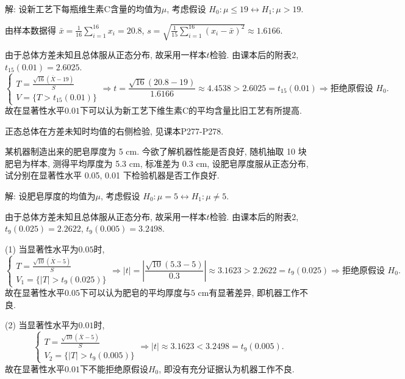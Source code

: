 \documentclass[standard]{ExBook}
\renewenvironment{shaded}{%
  \def\FrameCommand{\fboxsep=\FrameSep \colorbox{shadecolor}}%
  \MakeFramed{\advance\hsize-\width \FrameRestore}%
}{%
  \endMakeFramed
}
\begin{document}
\begin{qitems}
解: 设新工艺下每瓶维生素C含量的均值为$\mu$, 考虑假设
$
H_0:\mu\leq19
\longleftrightarrow
H_1:\mu>19
$.

由样本数据得
$
\bar{x}
=\frac{1}{16}\sum_{i=1}^{16}x_i
=20.8$,
$
s
=\sqrt{\frac{1}{15}\sum_{i=1}^{16}(x_i-\bar{x})^2}
\approx1.6166
$.

由于总体方差未知且总体服从正态分布, 故采用一样本$t$检验. 由课本后的附表2, $t_{15}(0.01)=2.6025$.
$$
\left\{
\begin{array}{l}
\displaystyle
T=\frac{\sqrt{16}(\overline{X}-19)}{S}\\
V=\{T>t_{15}(0.01)\}
\end{array}
\right.
\Longrightarrow
t
=\frac{\sqrt{16}(20.8-19)}{1.6166}
\approx4.4538
>2.6025=t_{15}(0.01)
\Longrightarrow
\text{拒绝原假设 }H_0.
$$
故在显著性水平$0.01$下可以认为新工艺下维生素C的平均含量比旧工艺有所提高.

\textcolor{themeColor}{\selectfont {} 正态总体在方差未知时均值的右侧检验, 见课本P277-P278.}

\vspace{2.5cm-5em}

    \begin{bbox}
    \begin{shaded}
        \qitem
某机器制造出来的肥皂厚度为 5 cm. 今欲了解机器性能是否良好, 随机抽取 10 块肥皂为样本, 测得平均厚度为 5.3 cm, 标准差为 0.3 cm, 设肥皂厚度服从正态分布, 试分别在显著性水平 0.05, 0.01 下检验机器是否工作良好.
    \end{shaded}
    \end{bbox}

\vspace{\dimexpr2.5cm-5em\relax}

解: 设肥皂厚度的均值为$\mu$, 考虑假设
$
H_0:\mu=5
\longleftrightarrow
H_1:\mu\neq5
$.

由于总体方差未知且总体服从正态分布, 故采用一样本$t$检验. 由课本后的附表2, $t_9(0.025)=2.2622$, $t_9(0.005)=3.2498$.

(1) 当显著性水平为$0.05$时,
$$
\left\{
\begin{array}{l}
\displaystyle
T=\frac{\sqrt{10}(\overline{X}-5)}{S}\\
V_1=\{|T|>t_9(0.025)\}
\end{array}
\right.
\Longrightarrow
|t|
=\left|\frac{\sqrt{10}(5.3-5)}{0.3}\right|
\approx3.1623
>2.2622=t_9(0.025)
\Longrightarrow
\text{拒绝原假设 }H_0.
$$
故在显著性水平$0.05$下可以认为肥皂的平均厚度与$5\text{ cm}$有显著差异, 即机器工作不良.

(2) 当显著性水平为$0.01$时,
$$
\left\{
\begin{array}{l}
\displaystyle
T=\frac{\sqrt{10}(\overline{X}-5)}{S}\\
V_2=\{|T|>t_9(0.005)\}
\end{array}
\right.
\Longrightarrow
|t|
\approx3.1623
<3.2498=t_9(0.005).
$$
故在显著性水平$0.01$下不能拒绝原假设$H_0$, 即没有充分证据认为机器工作不良.


\end{qitems}
\end{document}
